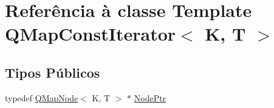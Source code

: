 \hypertarget{class_q_map_const_iterator}{\section{Referência à classe Template Q\-Map\-Const\-Iterator$<$ K, T $>$}
\label{class_q_map_const_iterator}
}
\subsection*{Tipos Públicos}
\begin{DoxyCompactItemize}
\item 
typedef \hyperlink{struct_q_map_node}{Q\-Map\-Node}$<$ K, T $>$ $\ast$ \hyperlink{class_q_map_const_iterator_af69493335fdffece95c987f0054ab47e}{Node\-Ptr}
\end{DoxyCompactItemize}
